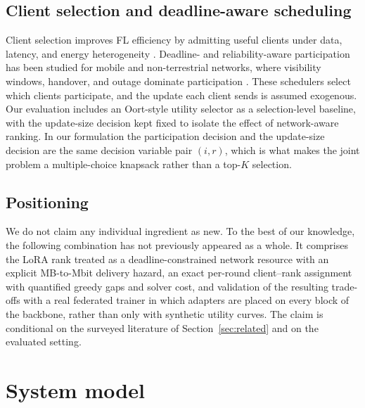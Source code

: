 \documentclass[preprint,12pt]{elsarticle}
\begin{document}
\subsection{Client selection and deadline-aware scheduling}
Client selection improves FL efficiency by admitting useful clients under data, latency, and energy heterogeneity \cite{oort2021oort,chen2024clientselection,dong2024aoi,luo2021costeffective}. Deadline- and reliability-aware participation has been studied for mobile and non-terrestrial networks, where visibility windows, handover, and outage dominate participation \cite{razmi2022ground,tang2023flsagin,qin2024dfrl,ribero2023intermittent,han2024orchestrating}. These schedulers select which clients participate, and the update each client sends is assumed exogenous. Our evaluation includes an Oort-style utility selector \cite{oort2021oort} as a selection-level baseline, with the update-size decision kept fixed to isolate the effect of network-aware ranking. In our formulation the participation decision and the update-size decision are the same decision variable pair $(i, r)$, which is what makes the joint problem a multiple-choice knapsack rather than a top-$K$ selection.

\subsection{Positioning}
We do not claim any individual ingredient as new. To the best of our knowledge, the following combination has not previously appeared as a whole. It comprises the LoRA rank treated as a deadline-constrained network resource with an explicit MB-to-Mbit delivery hazard, an exact per-round client--rank assignment with quantified greedy gaps and solver cost, and validation of the resulting trade-offs with a real federated trainer in which adapters are placed on every block of the backbone, rather than only with synthetic utility curves. The claim is conditional on the surveyed literature of Section~\ref{sec:related} and on the evaluated setting.

\section{System model}
\label{sec:model}
\end{document}
